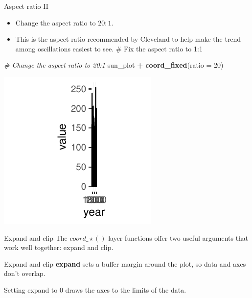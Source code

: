 \documentclass[
  ignorenonframetext,
]{beamer}
\newenvironment{Shaded}{\begin{snugshade}}{\end{snugshade}}
\newcommand{\AttributeTok}[1]{\textcolor[rgb]{0.13,0.29,0.53}{#1}}
\newcommand{\CommentTok}[1]{\textcolor[rgb]{0.56,0.35,0.01}{\textit{#1}}}
\newcommand{\DecValTok}[1]{\textcolor[rgb]{0.00,0.00,0.81}{#1}}
\newcommand{\FunctionTok}[1]{\textcolor[rgb]{0.13,0.29,0.53}{\textbf{#1}}}
\newcommand{\NormalTok}[1]{#1}
\newcommand{\SpecialCharTok}[1]{\textcolor[rgb]{0.81,0.36,0.00}{\textbf{#1}}}
\begin{document}
\begin{frame}[fragile]{Aspect ratio II}
\label{aspect-ratio-ii-5}
\begin{itemize}
\item
  Change the aspect ratio to \(20:1\).
\item
  This is the aspect ratio recommended by Cleveland to help make the
  trend among oscillations easiest to see. \# Fix the aspect ratio to
  1:1
\end{itemize}


\begin{Shaded}
\begin{Highlighting}[]
\CommentTok{\# Change the aspect ratio to 20:1}
\NormalTok{sun\_plot }\SpecialCharTok{+} \FunctionTok{coord\_fixed}\NormalTok{(}\AttributeTok{ratio =} \DecValTok{20}\NormalTok{)}
\end{Highlighting}
\end{Shaded}

\begin{center}\includegraphics[width=0.5\linewidth]{Figs/unnamed-chunk-45-1} \end{center}
\end{frame}

\begin{frame}{Expand and clip}
\label{expand-and-clip}
The \(coord\_\star()\) layer functions offer two useful arguments that
work well together: expand and clip.
\end{frame}

\begin{frame}{Expand and clip}
\label{expand-and-clip-1}
\textbf{expand} sets a buffer margin around the plot, so data and axes
don't overlap.

Setting expand to 0 draws the axes to the limits of the data.
\end{frame}
\end{document}
